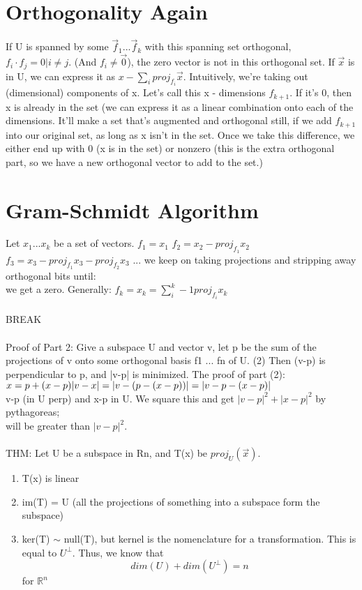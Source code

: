 \documentclass[10pt, twocolumn]{report}
\begin{document}
\section{Orthogonality Again}
If U is spanned by some $\vec f_1 ... \vec f_k$ with this spanning set orthogonal, $f_i \cdot f_j = 0 | i\neq j$. (And $f_i \neq \vec 0$), the zero vector is not in this orthogonal set. If $\vec x$ is in U, we can express it as $x - \sum_i proj_{f_i}\vec x. $ Intuitively, we're taking out (dimensional) components of x. Let's call this x - dimensions $f_{k+1}$. If it's 0, then x is already in the set (we can express it as a linear combination onto each of the dimensions. It'll make a set that's augmented and orthogonal still, if we add $f_{k+1}$ into our original set, as long as x isn't in the set. Once we take this difference, we either end up with 0 (x is in the set) or nonzero (this is the extra orthogonal part, so we have a new orthogonal vector to add to the set.)
\section {Gram-Schmidt Algorithm}
Let $x_1 ... x_k$ be a set of vectors.
$f_1 = x_1$
$f_2 = x_2 - proj_{f_1} x_2$
$f_3 = x_3 - proj_{f_1} x_3 - proj_{f_2} x_3$ ... we keep on taking projections and stripping away orthogonal bits until:\\ we get a zero. Generally:
$f_k = x_k = \sum_i^k-1 proj_{f_i}x_k$\\\\

BREAK \\\\

Proof of Part 2: Give a subspace U and vector v, let p be the sum of the projections of v onto some orthogonal basis f1 ... fn of U. (2) Then (v-p) is perpendicular to p, and |v-p| is minimized. The proof of part (2):\\
$x = p + (x-p) \\ |v-x| = |v-(p-(x-p))| \\ = |v-p - (x-p) |$ \\ v-p (in U perp) and x-p in U. We square this and get  $|v-p|^2 + |x-p|^2$ by pythagoreas;\\ will be greater than $|v-p|^2$.\\\\THM: Let U be a subspace in Rn, and T(x) be $proj_U(\vec x)$.\\ \begin{enumerate}
	\item T(x) is linear
	\item im(T) = U (all the projections of something into a subspace form the subspace)
	\item ker(T) $\sim$ null(T), but kernel is the nomenclature for a transformation. This is equal to $U^\perp$. Thus, we know that $$dim(U) + dim(U^\perp) = n$$ for $\mathbb{R}^n$
\end{enumerate}
\end{document}
